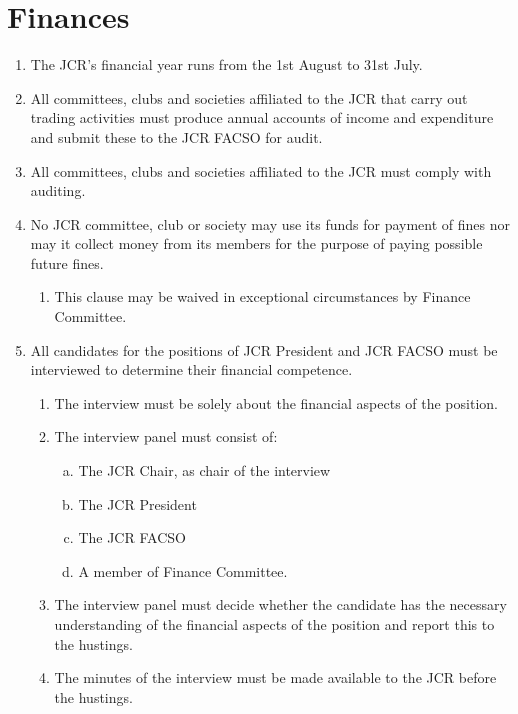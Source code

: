 \documentclass[12pt]{article}
\begin{document}
\section{Finances}
\begin{enumerate}
    \item The JCR's financial year runs from the 1st August to 31st July.
    \item All committees, clubs and societies affiliated to the JCR that carry out trading activities must produce annual accounts of income and expenditure and submit these to the JCR FACSO for audit.
    \item All committees, clubs and societies affiliated to the JCR must comply with auditing.
    \item No JCR committee, club or society may use its funds for payment of fines nor may it collect money from its members for the purpose of paying possible future fines.
    \begin{enumerate}
        \item This clause may be waived in exceptional circumstances by Finance Committee.
    \end{enumerate}
    \item All candidates for the positions of JCR President and JCR FACSO must be interviewed to determine their financial competence.
    \begin{enumerate}
        \item The interview must be solely about the financial aspects of the position.
        \item The interview panel must consist of:
        \begin{enumerate}[(a)]
            \item The JCR Chair, as chair of the interview
            \item The JCR President
            \item The JCR FACSO
            \item A member of Finance Committee.
        \end{enumerate}
        \item The interview panel must decide whether the candidate has the necessary understanding of the financial aspects of the position and report this to the hustings.
        \item The minutes of the interview must be made available to the JCR before the hustings.
    \end{enumerate}

\end{enumerate}
\end{document}
